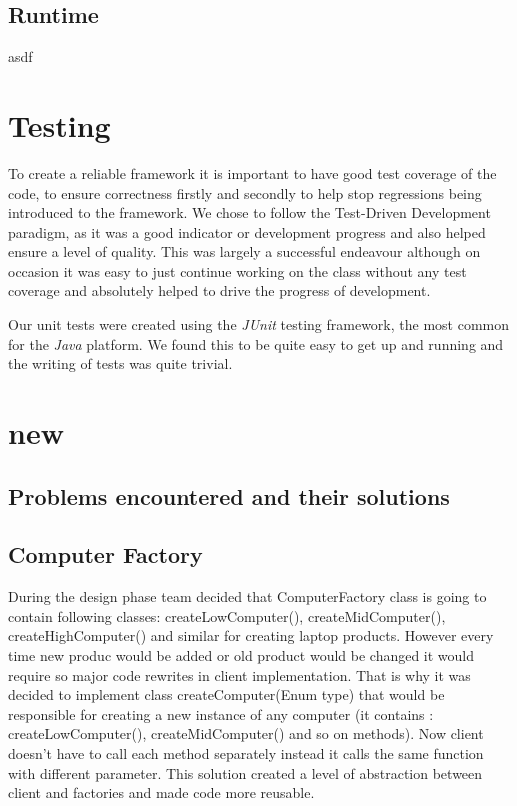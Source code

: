 \documentclass[pdftex,11pt,a4paper]{article}
\begin{document}
\subsection{Runtime}
asdf
\pagebreak

\section{Testing}
To create a reliable framework it is important to have good test coverage of the code, to ensure correctness firstly and secondly to help stop regressions being introduced to the framework. We chose to follow the Test-Driven Development paradigm, as it was a good indicator or development progress and also helped ensure a level of quality. This was largely a successful endeavour although on occasion it was easy to just continue working on the class without any test coverage and absolutely helped to drive the progress of development.

Our unit tests were created using the \emph{JUnit} testing framework, the most common for the \emph{Java} platform. We found this to be quite easy to get up and running and the writing of tests was quite trivial.


\pagebreak

\section{new}
\subsection{Problems encountered and their solutions}
\subsection{Computer Factory}
During the design phase team decided that ComputerFactory class is going to contain following classes: createLowComputer(), createMidComputer(), createHighComputer() and similar for creating laptop products. However every time new produc would be added or old product would be changed it would require so major code rewrites in client implementation. That is why it was decided to implement class createComputer(Enum type) that would be responsible for creating a new instance of any computer (it contains : createLowComputer(), createMidComputer() and so on methods). Now client doesn't have to call each method separately instead it calls the same function with different parameter. This solution created a level of abstraction between client and factories and made code more reusable.
\end{document}
